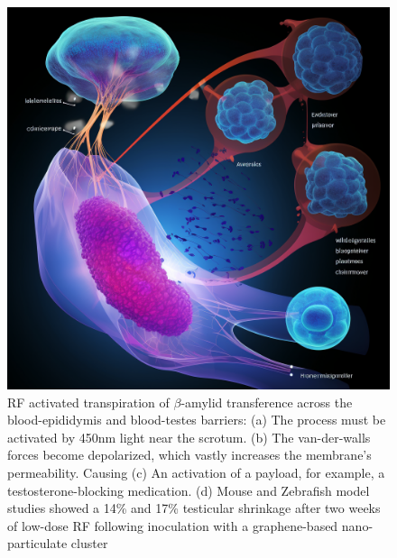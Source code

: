 \documentclass[twoside,twocolumn,9pt]{article}
\begin{document}
\begin{figure}
    \centering
    \includegraphics[width=1.0\linewidth]{testosterone_decrease.png}
    \caption{RF activated transpiration of $\beta$-amylid transference across the blood-epididymis and blood-testes barriers: (a) The process must be activated by 450nm light near the scrotum. (b) The van-der-walls forces become depolarized, which vastly increases the membrane's permeability. Causing (c) An activation of a payload, for example, a testosterone-blocking medication. (d) Mouse and Zebrafish model studies showed a 14\% and 17\% testicular shrinkage after two weeks of low-dose RF following inoculation with a graphene-based nano-particulate cluster}
    \label{fig:3}
\end{figure}
\end{document}
